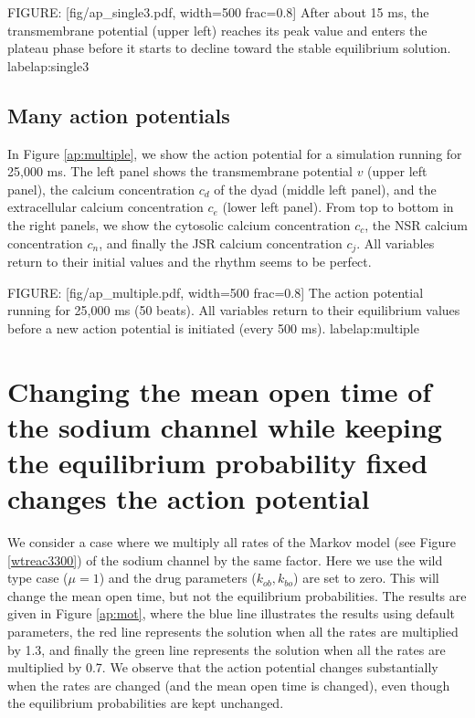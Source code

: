 FIGURE: [fig/ap_single3.pdf, width=500 frac=0.8] After about 15 ms, the transmembrane potential (upper left) reaches its peak value and enters the plateau phase before it starts to decline toward the stable equilibrium solution.  label{ap:single3}

\subsection{Many action potentials}

In Figure \ref{ap:multiple}, we show the action potential for a simulation running for 25,000 ms. The left panel shows the transmembrane potential $v$ (upper left panel), the calcium concentration $c_d$ of the dyad (middle left panel), and the extracellular calcium concentration $c_e$ (lower left panel). From top to bottom in the right panels, we show the cytosolic calcium concentration $c_c$, the NSR calcium concentration $c_n$, and finally the JSR calcium concentration $c_j$. All variables return to their initial values and the rhythm seems to be perfect.

FIGURE: [fig/ap_multiple.pdf, width=500 frac=0.8] The action potential running for 25,000 ms (50 beats). All variables return to their equilibrium values before a new action potential is initiated (every 500 ms).  label{ap:multiple}

\section[Changing the mean open time]{Changing the mean open time of the sodium channel while keeping the equilibrium probability fixed changes the action potential}
\label{sec:ap_mot}

We consider a case where we multiply all rates of the Markov model (see Figure \ref{wtreac3300}) of the sodium channel by the same factor. Here we use the wild type case ($\mu=1$) and the drug parameters ($k_{ob}, k_{bo}$) are set to zero. This will change the mean open time, but not the equilibrium probabilities. The results are given in Figure \ref{ap:mot}, where the blue line illustrates the results using default parameters, the red line represents the solution when all the rates are multiplied by 1.3, and finally the green line represents the solution when all the rates are multiplied by 0.7. We observe that the action potential changes substantially when the rates are changed (and the mean open time is changed), even though the equilibrium probabilities are kept unchanged.

